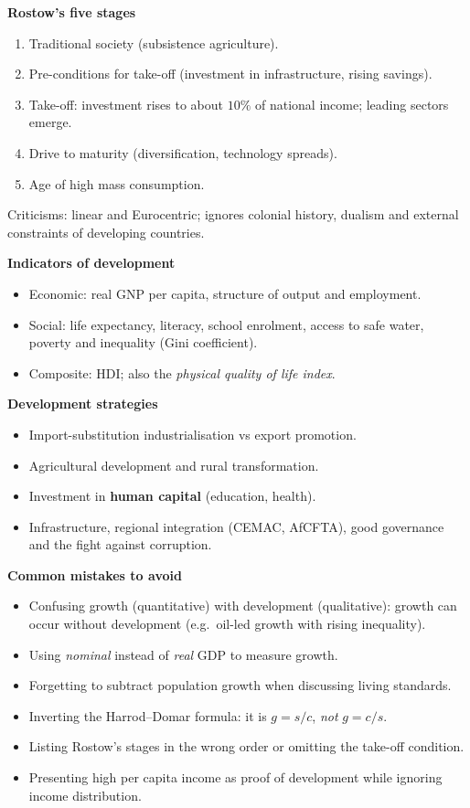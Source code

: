 \documentclass[11pt]{article}
\newcommand{\cle}[1]{{\popxbold\color{popdark}#1}}
\begin{document}
\begin{bilan}
\textbf{Rostow's five stages}\par
\begin{enumerate}
\item Traditional society (subsistence agriculture).
\item Pre-conditions for take-off (investment in infrastructure, rising savings).
\item \cle{Take-off}: investment rises to about $10\%$ of national income; leading sectors emerge.
\item Drive to maturity (diversification, technology spreads).
\item Age of high mass consumption.
\end{enumerate}
Criticisms: linear and Eurocentric; ignores colonial history, dualism and external constraints of developing countries.

\textbf{Indicators of development}\par
\begin{itemize}
\item Economic: real GNP per capita, structure of output and employment.
\item Social: life expectancy, literacy, school enrolment, access to safe water, poverty and inequality (Gini coefficient).
\item Composite: HDI; also the \emph{physical quality of life index}.
\end{itemize}

\textbf{Development strategies}\par
\begin{itemize}
\item Import-substitution industrialisation vs export promotion.
\item Agricultural development and rural transformation.
\item Investment in \textbf{human capital} (education, health).
\item Infrastructure, regional integration (CEMAC, AfCFTA), good governance and the fight against corruption.
\end{itemize}

\textbf{Common mistakes to avoid}\par
\begin{itemize}
\item Confusing \cle{growth} (quantitative) with \cle{development} (qualitative): growth can occur without development (e.g.\ oil-led growth with rising inequality).
\item Using \emph{nominal} instead of \emph{real} GDP to measure growth.
\item Forgetting to subtract population growth when discussing living standards.
\item Inverting the Harrod--Domar formula: it is $g = s/c$, \emph{not} $g = c/s$.
\item Listing Rostow's stages in the wrong order or omitting the take-off condition.
\item Presenting high per capita income as proof of development while ignoring income distribution.
\end{itemize}


\end{bilan}
\end{document}
